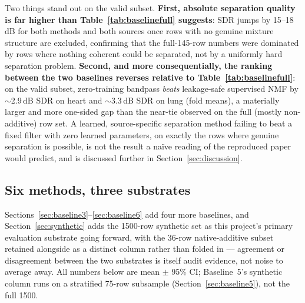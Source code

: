 \documentclass[11pt]{article}
\begin{document}
Two things stand out on the valid subset. \textbf{First, absolute separation
quality is far higher than Table~\ref{tab:baselinefull} suggests}: SDR jumps
by 15--18\,dB for both methods and both sources once rows with no genuine
mixture structure are excluded, confirming that the full-145-row numbers
were dominated by rows where nothing coherent could be separated, not by a
uniformly hard separation problem. \textbf{Second, and more consequentially,
the ranking between the two baselines reverses relative to
Table~\ref{tab:baselinefull}}: on the valid subset, zero-training bandpass
\emph{beats} leakage-safe supervised NMF by $\sim$2.9\,dB SDR on heart and
$\sim$3.3\,dB SDR on lung (fold means), a materially larger and more one-sided gap than
the near-tie observed on the full (mostly non-additive) row set. A learned,
source-specific separation method failing to beat a fixed filter with zero
learned parameters, on exactly the rows where genuine separation is
possible, is not the result a na\"ive reading of the reproduced paper would
predict, and is discussed further in Section~\ref{sec:discussion}.

\subsection{Six methods, three substrates}
\label{sec:sixmethod}

Sections~\ref{sec:baseline3}--\ref{sec:baseline6} add four more baselines,
and Section~\ref{sec:synthetic} adds the 1500-row synthetic set as this
project's primary evaluation substrate going forward, with the 36-row
native-additive subset retained alongside as a distinct column rather than
folded in --- agreement or disagreement between the two substrates is
itself audit evidence, not noise to average away. All numbers below are
mean $\pm$ 95\% CI; Baseline~5's synthetic column runs on a stratified
75-row subsample (Section~\ref{sec:baseline5}), not the full 1500.
\end{document}

